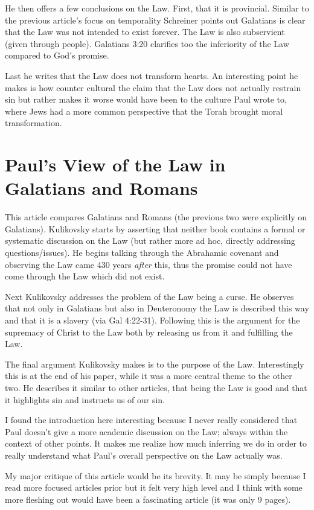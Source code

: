 \documentclass[12pt]{turabian-researchpaper}
\begin{document}
He then offers a few conclusions on the Law. First, that it is provincial. Similar to the previous article's focus on temporality Schreiner points out Galatians is clear that the Law was not intended to exist forever. The Law is also subservient (given through people).  Galatians 3:20 clarifies too the inferiority of the Law compared to God's promise.

Last he writes that the Law does not transform hearts. An interesting point he makes is how counter cultural the claim that the Law does not actually restrain sin but rather makes it worse would have been to the culture Paul wrote to, where Jews had a more common perspective that the Torah brought moral transformation.

\section{Paul's View of the Law in Galatians and Romans \autocite{kulikovsky99}}

This article compares Galatians and Romans (the previous two were explicitly on Galatians). Kulikovsky starts by asserting that neither book contains a formal or systematic discussion on the Law (but rather more ad hoc, directly addressing questions/issues). He begins talking through the Abrahamic covenant and observing the Law came 430 years \textit{after} this, thus the promise could not have come through the Law which did not exist.

Next Kulikovsky addresses the problem of the Law being a curse. He observes that not only in Galatians but also in Deuteronomy the Law is described this way and that it is a slavery (via Gal 4:22-31). Following this is the argument for the supremacy of Christ to the Law both by releasing us from it and fulfilling the Law.

The final argument Kulikovsky makes is to the purpose of the Law. Interestingly this is at the end of his paper, while it was a more central theme to the other two. He describes it similar to other articles, that being the Law is good and that it highlights sin and instructs us of our sin.

I found the introduction here interesting because I never really considered that Paul doesn't give a more academic discussion on the Law; always within the context of other points. It makes me realize how much inferring we do in order to really understand what Paul's overall perspective on the Law actually was.

My major critique of this article would be its brevity. It may be simply because I read more focused articles prior but it felt very high level and I think with some more fleshing out would have been a fascinating article (it was only 9 pages).
\newpage


\printbibliography
\end{document}
